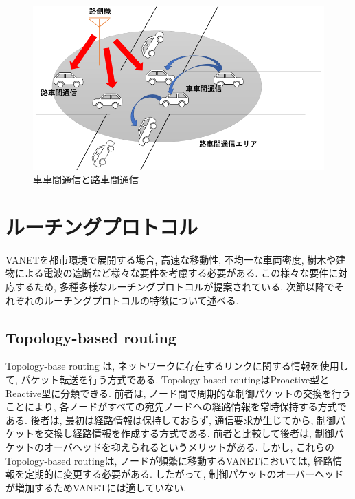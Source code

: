 \documentclass[10pt]{jreport}
\begin{document}
\begin{figure}[!ht]
\centering
\includegraphics[width=15cm]{figures/2_2.png}
\caption{車車間通信と路車間通信}
\end{figure}


\section{ルーチングプロトコル}
\label{RoutingProtocol}
VANETを都市環境で展開する場合, 高速な移動性, 不均一な車両密度, 樹木や建物による電波の遮断など様々な要件を考慮する必要がある. この様々な要件に対応するため, 多種多様なルーチングプロトコルが提案されている\cite{2}. 次節以降でそれぞれのルーチングプロトコルの特徴について述べる.

\subsection{Topology-based routing}
\label{Topology}
Topology-base routing\cite {3,4,5} は, ネットワークに存在するリンクに関する情報を使用して, パケット転送を行う方式である. Topology-based routingはProactive型とReactive型に分類できる. 前者は, ノード間で周期的な制御パケットの交換を行うことにより, 各ノードがすべての宛先ノードへの経路情報を常時保持する方式である. 後者は, 最初は経路情報は保持しておらず, 通信要求が生じてから, 制御パケットを交換し経路情報を作成する方式である. 前者と比較して後者は, 制御パケットのオーバヘッドを抑えられるというメリットがある. 
しかし, これらのTopology-based routingは, ノードが頻繁に移動するVANETにおいては, 経路情報を定期的に変更する必要がある.
したがって, 制御パケットのオーバーヘッドが増加するためVANETには適していない.
\end{document}
